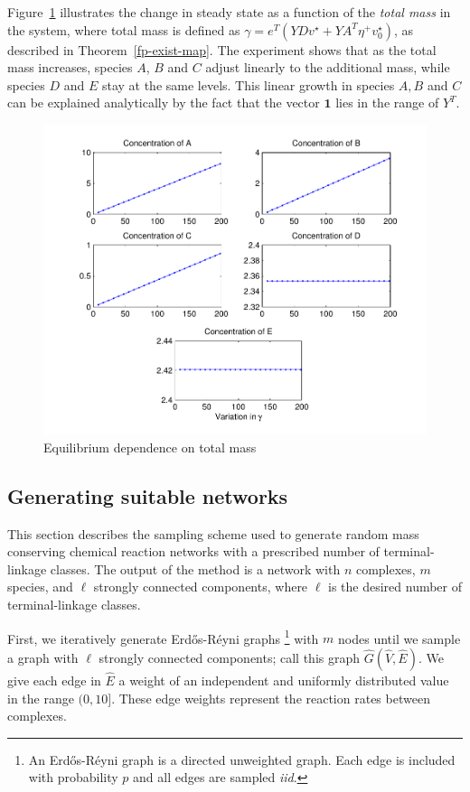 \documentclass[smallextended]{svjour3}       %
\newcounter{sent}
\newcommand*{\0}{\mathbf{0}}
\newcommand*{\1}{\mathbf{1}}
\begin{document}
Figure~\ref{EquilibriumVsTotalMass} illustrates the change in steady state as a
function of the \emph{total mass} in the system, where total mass is defined as
$\gamma = e^T(YD v^\star + YA^T \eta^+ v^\star_0)$, as described in
Theorem~\ref{fp-exist-map}.  The experiment shows that as the total mass increases,
species $A$, $B$ and $C$ adjust linearly to the additional mass, while species
$D$ and $E$ stay at the same levels.  This linear growth in species $A, B$ and
$C$ can be explained analytically by the fact that the vector $\mathbf{1}$ lies
in the range of $Y^{T}$. 

\begin{figure}%
   \sidecaption
   \includegraphics[width=4.5in]{EquilibriumVsTotalMassExample}
   \caption{Equilibrium dependence on total mass} 
   \label{EquilibriumVsTotalMass}
\end{figure}

\subsection{Generating suitable networks}

This section describes the sampling scheme used to generate random mass
conserving chemical reaction networks with a prescribed number of
terminal-linkage classes.  The output of the method is a network with $n$
complexes, $m$ species, and $\ell$ strongly connected components, where $\ell$
is the desired number of terminal-linkage classes.

First, we iteratively generate Erd\H{o}s-R\'{e}yni graphs%
\footnote{An Erd\H{o}s-R\'{e}yni graph is a directed unweighted graph. Each
edge is included with probability $p$ and all edges are sampled \emph{iid}.} %
with $m$ nodes until we sample a graph with $\ell$ strongly connected
components; call this graph $\hat G( \hat V, \hat E)$.  We give each edge in 
$\hat E$ a weight of an independent and uniformly distributed value in the
range $(0,10]$.  These edge weights represent the reaction rates between
complexes.
\end{document}
